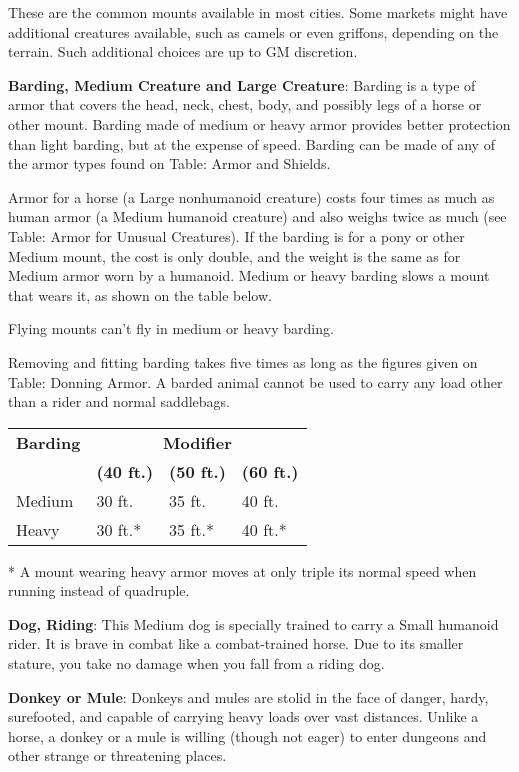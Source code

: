 		
These are the common mounts available in most cities. Some markets might have additional creatures available, such as camels or even griffons, depending on the terrain. Such additional choices are up to GM discretion.
		
\textbf{Barding, Medium Creature and Large Creature}: Barding is a type of armor that covers the head, neck, chest, body, and possibly legs of a horse or other mount. Barding made of medium or heavy armor provides better protection than light barding, but at the expense of speed. Barding can be made of any of the armor types found on Table: Armor and Shields.
		
Armor for a horse (a Large nonhumanoid creature) costs four times as much as human armor (a Medium humanoid creature) and also weighs twice as much (see Table: Armor for Unusual Creatures). If the barding is for a pony or other Medium mount, the cost is only double, and the weight is the same as for Medium armor worn by a humanoid. Medium or heavy barding slows a mount that wears it, as shown on the table below.
		
Flying mounts can't fly in medium or heavy barding.
		
Removing and fitting barding takes five times as long as the figures given on Table: Donning Armor. A barded animal cannot be used to carry any load other than a rider and normal saddlebags.

\begin{table}
 \sffamily
 \begin{tabular}{llll}
\textbf{Barding} & \multicolumn{3}{c}{\textbf{Modifier}}\\
                 & \textbf{(40 ft.)} & \textbf{(50 ft.)} & \textbf{(60 ft.)} \\
Medium           & 30 ft. & 35 ft. & 40 ft.\\
Heavy            & 30 ft.* & 35 ft.* & 40 ft.*  \\
 \end{tabular}
 * A mount wearing heavy armor moves at only triple its normal speed when running instead of quadruple.
\end{table}
\textbf{Dog, Riding}: This Medium dog is specially trained to carry a Small humanoid rider. It is brave in combat like a combat-trained horse. Due to its smaller stature, you take no damage when you fall from a riding dog.
		
\textbf{Donkey or Mule}: Donkeys and mules are stolid in the face of danger, hardy, surefooted, and capable of carrying heavy loads over vast distances. Unlike a horse, a donkey or a mule is willing (though not eager) to enter dungeons and other strange or threatening places.
		
